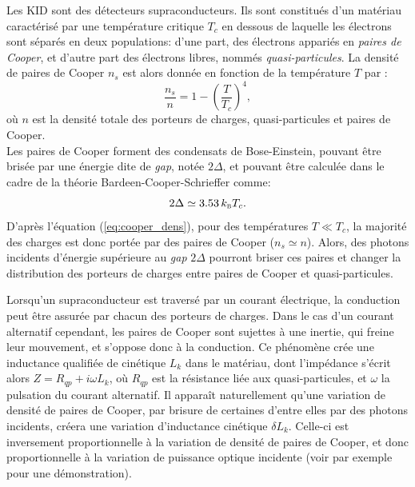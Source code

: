 Les KID sont des détecteurs supraconducteurs.
Ils sont constitués d'un matériau caractérisé par une température critique $T_c$ en dessous de laquelle les électrons sont séparés en deux populations: d'une part, des électrons appariés en \textit{paires de Cooper}, et d'autre part des électrons libres, nommés \textit{quasi-particules}.
La densité de paires de Cooper $n_s$ est alors donnée en fonction de la température $T$ par \cite{gorter_supraconductivity_1934}:
\begin{equation}
    \label{eq:cooper_dens}
    \frac{n_s}{n} = 1 - \left(\frac{T}{T_c}\right)^4,
\end{equation}
où $n$ est la densité totale des porteurs de charges, quasi-particules et paires de Cooper. \\
Les paires de Cooper forment des condensats de Bose-Einstein, pouvant être brisée par une énergie dite de \textit{gap}, notée $2\Delta$, et pouvant être calculée dans le cadre de la théorie Bardeen-Cooper-Schrieffer \cite{bardeen_microscopic_1957,bardeen_theory_1957} comme:
\begin{equation}
    2\Delta \simeq 3.53 \, k_\textsc{b} T_c.
\end{equation}
D'après l'équation (\ref{eq:cooper_dens}), pour des températures $T \ll T_c$, la majorité des charges est donc portée par des paires de Cooper ($n_s \simeq n$).
Alors, des photons incidents d'énergie supérieure au \textit{gap} $2\Delta$ pourront briser ces paires et changer la distribution des porteurs de charges entre paires de Cooper et quasi-particules.

Lorsqu'un supraconducteur est traversé par un courant électrique, la conduction peut être assurée par chacun des porteurs de charges.
Dans le cas d'un courant alternatif cependant, les paires de Cooper sont sujettes à une inertie, qui freine leur mouvement, et s'oppose donc à la conduction.
Ce phénomène crée une inductance qualifiée de cinétique $L_k$ dans le matériau, dont l'impédance s'écrit alors $Z = R_{qp} + i\omega L_k$, où $R_{qp}$ est la résistance liée aux quasi-particules, et $\omega$ la pulsation du courant alternatif.
Il apparaît naturellement qu'une variation de densité de paires de Cooper, par brisure de certaines d'entre elles par des photons incidents, créera une variation d'inductance cinétique $\delta L_k$.
Celle-ci est inversement proportionnelle à la variation de densité de paires de Cooper, et donc proportionnelle à la variation de puissance optique incidente (voir par exemple \cite{day_broadband_2003} pour une démonstration).

